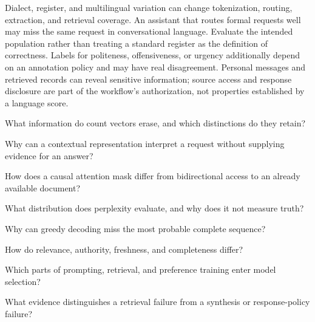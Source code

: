 Dialect, register, and multilingual variation can change tokenization, routing, extraction, and retrieval coverage. An assistant that routes formal requests well may miss the same request in conversational language. Evaluate the intended population rather than treating a standard register as the definition of correctness. Labels for politeness, offensiveness, or urgency additionally depend on an annotation policy and may have real disagreement. Personal messages and retrieved records can reveal sensitive information; source access and response disclosure are part of the workflow's authorization, not properties established by a language score.

\begin{studyquestions}
\item What information do count vectors erase, and which distinctions do they retain?
\item Why can a contextual representation interpret a request without supplying evidence for an answer?
\item How does a causal attention mask differ from bidirectional access to an already available document?
\item What distribution does perplexity evaluate, and why does it not measure truth?
\item Why can greedy decoding miss the most probable complete sequence?
\item How do relevance, authority, freshness, and completeness differ?
\item Which parts of prompting, retrieval, and preference training enter model selection?
\item What evidence distinguishes a retrieval failure from a synthesis or response-policy failure?
\end{studyquestions}

